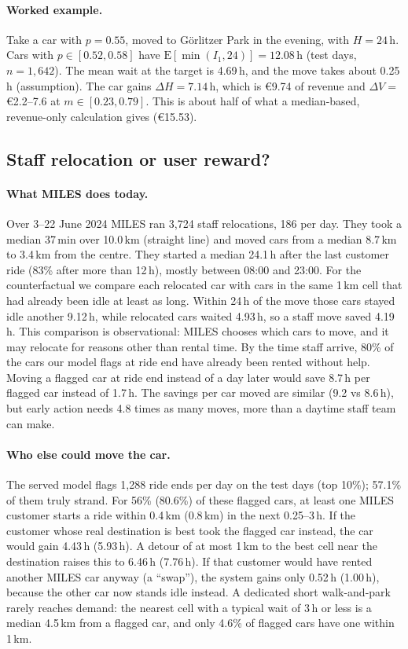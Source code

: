 \documentclass[11pt,a4paper]{article}
\newcommand{\eur}[1]{\euro{}#1}
\begin{document}
\paragraph{Worked example.}
Take a car with $p=0.55$, moved to G\"orlitzer Park in the evening, with $H=24$\,h. Cars with $p\in[0.52,0.58]$ have $\mathrm{E}[\min(I_1,24)]=12.08$\,h (test days, $n=1{,}642$). The mean wait at the target is 4.69\,h, and the move takes about 0.25\,h (assumption). The car gains $\Delta H=7.14$\,h, which is \eur{9.74} of revenue and $\Delta V={}$\eur{2.2}--7.6 at $m\in[0.23,0.79]$. This is about half of what a median-based, revenue-only calculation gives (\eur{15.53}).

\subsection{Staff relocation or user reward?}\label{sec:ab-mech}

\paragraph{What MILES does today.}
Over 3--22 June 2024 MILES ran 3{,}724 staff relocations, 186 per day. They took a median 37\,min over 10.0\,km (straight line) and moved cars from a median 8.7\,km to 3.4\,km from the centre. They started a median 24.1\,h after the last customer ride (83\% after more than 12\,h), mostly between 08:00 and 23:00. For the counterfactual we compare each relocated car with cars in the same 1\,km cell that had already been idle at least as long. Within 24\,h of the move those cars stayed idle another 9.12\,h, while relocated cars waited 4.93\,h, so a staff move saved 4.19\,h. This comparison is observational: MILES chooses which cars to move, and it may relocate for reasons other than rental time. By the time staff arrive, 80\% of the cars our model flags at ride end have already been rented without help. Moving a flagged car at ride end instead of a day later would save 8.7\,h per flagged car instead of 1.7\,h. The savings per car moved are similar (9.2 vs 8.6\,h), but early action needs 4.8 times as many moves, more than a daytime staff team can make.

\paragraph{Who else could move the car.}
The served model flags 1{,}288 ride ends per day on the test days (top 10\%); 57.1\% of them truly strand. For 56\% (80.6\%) of these flagged cars, at least one MILES customer starts a ride within 0.4\,km (0.8\,km) in the next 0.25--3\,h. If the customer whose real destination is best took the flagged car instead, the car would gain 4.43\,h (5.93\,h). A detour of at most 1\,km to the best cell near the destination raises this to 6.46\,h (7.76\,h). If that customer would have rented another MILES car anyway (a ``swap''), the system gains only 0.52\,h (1.00\,h), because the other car now stands idle instead. A dedicated short walk-and-park rarely reaches demand: the nearest cell with a typical wait of 3\,h or less is a median 4.5\,km from a flagged car, and only 4.6\% of flagged cars have one within 1\,km.
\end{document}
